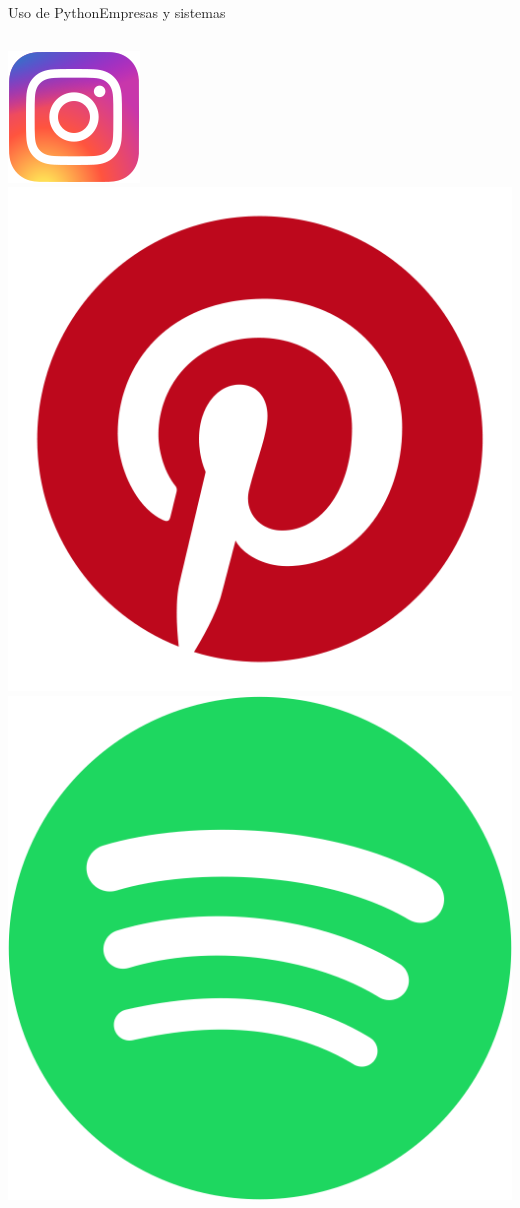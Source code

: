 \documentclass[aspectratio=169,10pt]{beamer}
\begin{document}
\begin{frame}{Uso de Python}{Empresas y sistemas}
  \begin{columns}
    \includegraphics[height=0.4\textheight]{instagram.png}
    \includegraphics[height=0.4\textheight]{pinterest.png}
    \includegraphics[height=0.4\textheight]{spotify.png}

\end{columns}
\end{frame}
\end{document}
